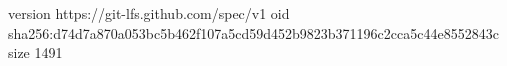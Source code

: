 version https://git-lfs.github.com/spec/v1
oid sha256:d74d7a870a053bc5b462f107a5cd59d452b9823b371196c2cca5c44e8552843c
size 1491
